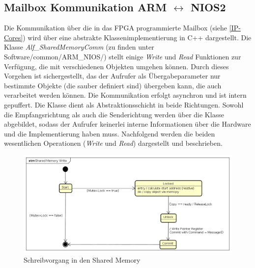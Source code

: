 \subsection{Mailbox Kommunikation ARM $\leftrightarrow$ NIOS2}
Die Kommunikation über die in das \ac{FPGA} programmierte Mailbox (siehe \ref{IP-Cores}) wird über eine abstrakte Klassenimplementierung in C++ dargestellt. Die Klasse \textit{Alf\_SharedMemoryComm} (zu finden unter Software/common/ARM\_NIOS/) stellt einige \textit{Write} und \textit{Read} Funktionen zur Verfügung, die mit verschiedenen Objekten umgehen können. Durch dieses Vorgehen ist sichergestellt, das der Aufrufer als Übergabeparameter nur bestimmte Objekte (die sauber definiert sind) übergeben kann, die auch verarbeitet werden können. Die Kommunikation erfolgt asynchron und ist intern gepuffert. Die Klasse dient als Abstraktionsschicht in beide Richtungen. Sowohl die Empfangsrichtung als auch die Senderichtung werden über die Klasse abgebildet, sodass der Aufrufer keinerlei interne Informationen über die Hardware und die Implementierung haben muss.
Nachfolgend werden die beiden wesentlichen Operationen (\textit{Write} und \textit{Read}) dargestellt und beschrieben.

\begin{figure}
	\includegraphics[width=\textwidth]{Abb/Shared_mem_Write.png}
	\caption{Schreibvorgang in den Shared Memory}
	\label{Software:Arm:SharedMemWrite}
\end{figure}

